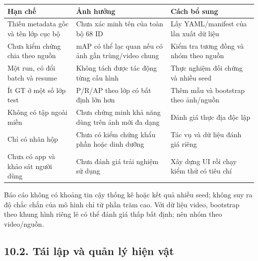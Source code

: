 \documentclass[
  vietnamese,
  12pt,
  a4paper,
]{article}
\newcounter{none} %
\begin{document}
{\def\LTcaptype{none} %
\begin{longtable}[]{@{}
  >{\raggedright\arraybackslash}p{}
  >{\raggedright\arraybackslash}p{}
  >{\raggedright\arraybackslash}p{}@{}}
\toprule\noalign{}
\begin{minipage}[b]{\linewidth}\raggedright
Hạn chế
\end{minipage} & \begin{minipage}[b]{\linewidth}\raggedright
Ảnh hưởng
\end{minipage} & \begin{minipage}[b]{\linewidth}\raggedright
Cách bổ sung
\end{minipage} \\
\midrule\noalign{}
\endhead
\bottomrule\noalign{}
\endlastfoot
Thiếu metadata gốc và tên lớp cục bộ & Chưa xác minh tên của toàn bộ 68
ID & Lấy YAML/manifest của lần xuất dữ liệu \\
Chưa kiểm chứng chia theo nguồn & mAP có thể lạc quan nếu có ảnh gần
trùng/video chung & Kiểm tra tương đồng và nhóm theo nguồn \\
Một run, có đổi batch và resume & Không tách được tác động từng cấu hình
& Thực nghiệm đối chứng và nhiều seed \\
Ít GT ở một số lớp test & P/R/AP theo lớp có bất định lớn hơn & Thêm mẫu
và bootstrap theo ảnh/nguồn \\
Không có tập ngoài miền & Chưa chứng minh khả năng dùng trên ảnh mới đa
dạng & Đánh giá thực địa độc lập \\
Chỉ có nhãn hộp & Chưa có kiểm chứng khẩu phần hoặc dinh dưỡng & Tác vụ
và dữ liệu đánh giá riêng \\
Chưa có app và khảo sát người dùng & Chưa đánh giá trải nghiệm sử dụng &
Xây dựng UI rồi chạy kiểm thử có tiêu chí \\
\end{longtable}
}

\endgroup

Báo cáo không có khoảng tin cậy thống kê hoặc kết quả nhiều seed; không
suy ra độ chắc chắn của mô hình chỉ từ phần trăm cao. Với dữ liệu video,
bootstrap theo khung hình riêng lẻ có thể đánh giá thấp bất định; nên
nhóm theo video/nguồn.

\subsection{10.2. Tái lập và quản lý hiện
vật}\label{tuxe1i-lux1eadp-vuxe0-quux1ea3n-luxfd-hiux1ec7n-vux1eadt}
\end{document}
